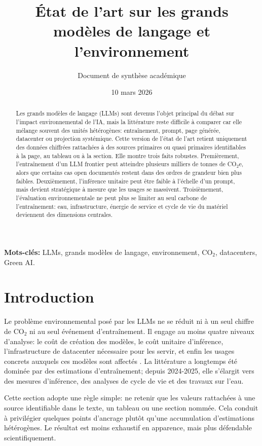 \documentclass[11pt,a4paper]{article}
\title{État de l'art sur les grands modèles de langage et l'environnement}
\author{Document de synthèse académique}
\date{10 mars 2026}
\begin{document}
\maketitle

\begin{abstract}
Les grands modèles de langage (LLMs) sont devenus l'objet principal du débat sur l'impact environnemental de l'IA, mais la littérature reste difficile à comparer car elle mélange souvent des unités hétérogènes: entraînement, prompt, page générée, datacenter ou projection systémique. Cette version de l'état de l'art retient uniquement des données chiffrées rattachées à des sources primaires ou quasi primaires identifiables à la page, au tableau ou à la section. Elle montre trois faits robustes. Premièrement, l'entraînement d'un LLM frontier peut atteindre plusieurs milliers de tonnes de CO$_2$e, alors que certains cas open documentés restent dans des ordres de grandeur bien plus faibles. Deuxièmement, l'inférence unitaire peut être faible à l'échelle d'un prompt, mais devient stratégique à mesure que les usages se massivent. Troisièmement, l'évaluation environnementale ne peut plus se limiter au seul carbone de l'entraînement: eau, infrastructure, énergie de service et cycle de vie du matériel deviennent des dimensions centrales.
\end{abstract}

\textbf{Mots-clés:} LLMs, grands modèles de langage, environnement, CO$_2$, datacenters, Green AI.

\section{Introduction}
Le problème environnemental posé par les LLMs ne se réduit ni à un seul chiffre de CO$_2$ ni au seul événement d'entraînement. Il engage au moins quatre niveaux d'analyse: le coût de création des modèles, le coût unitaire d'inférence, l'infrastructure de datacenter nécessaire pour les servir, et enfin les usages concrets auxquels ces modèles sont affectés \cite{rillig2023,ren2024,larosa2025}. La littérature a longtemps été dominée par des estimations d'entraînement; depuis 2024-2025, elle s'élargit vers des mesures d'inférence, des analyses de cycle de vie et des travaux sur l'eau.

Cette section adopte une règle simple: ne retenir que les valeurs rattachées à une source identifiable dans le texte, un tableau ou une section nommée. Cela conduit à privilégier quelques points d'ancrage plutôt qu'une accumulation d'estimations hétérogènes. Le résultat est moins exhaustif en apparence, mais plus défendable scientifiquement.
\end{document}
